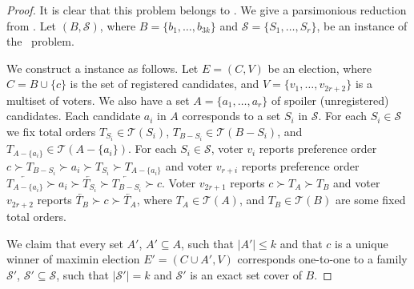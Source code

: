 \begin{proof}
It is clear that this problem belongs to \sharpPclass.
We give a parsimonious reduction from \sharpXthreeC.
Let $(B,\mathcal{S})$, where $B=\{b_1,\dots,b_{3k}\}$ and $\mathcal{S}=\{S_1,\dots,S_r\}$, be an instance of the \sharpXthreeC\ problem.

We construct a  instance as follows.
Let $E=(C,V)$ be an election, where $C=B\cup\{c\}$ is the set of registered candidates, and $V=\{v_1,\dots,v_{2r+2}\}$ is a multiset of voters.
We also have a set $A=\{a_1,\dots,a_r\}$ of spoiler (unregistered) candidates.
Each candidate $a_i$ in $A$ corresponds to a set $S_i$ in $\mathcal{S}$.
For each $S_i\in\mathcal{S}$ we fix total orders $T_{S_i}\in\mathcal{T}(S_i)$, $T_{B-S_i}\in\mathcal{T}(B-S_i)$, and $T_{A-\{a_i\}}\in\mathcal{T}(A-\{a_i\})$.
For each $S_i\in\mathcal{S}$, voter $v_i$ reports preference order $c\succ T_{B-S_i}\succ a_i\succ T_{S_i}\succ T_{A-\{a_i\}}$ and voter $v_{r+i}$ reports preference order $\overleftarrow{T_{A-\{a_i\}}}\succ a_i\succ\overleftarrow{T_{S_i}}\succ\overleftarrow{T_{B-S_i}}\succ c$.
Voter $v_{2r+1}$ reports $c\succ T_A\succ T_B$ and voter $v_{2r+2}$ reports $\overleftarrow{T_B}\succ c\succ\overleftarrow{T_A}$, where $T_A\in\mathcal{T}(A)$, and $T_B\in\mathcal{T}(B)$ are some fixed total orders.

We claim that every set $A'$, $A'\subseteq A$, such that $|A'|\le k$ and that $c$ is a unique winner of maximin election $E'=(C\cup A',V)$ corresponds one-to-one to a family $\mathcal{S'}$, $\mathcal{S'}\subseteq\mathcal{S}$, such that $|\mathcal{S'}|=k$ and $\mathcal{S'}$ is an exact set cover of $B$.


\end{proof}
